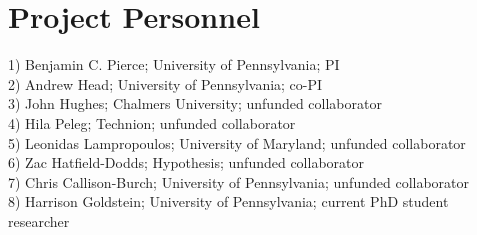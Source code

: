 \section*{Project Personnel}

1) Benjamin C. Pierce; University of Pennsylvania; PI \\
2) Andrew Head; University of Pennsylvania; co-PI \\
3) John Hughes; Chalmers University; unfunded collaborator \\
4) Hila Peleg; Technion; unfunded collaborator \\
5) Leonidas Lampropoulos; University of Maryland; unfunded collaborator \\
6) Zac Hatfield-Dodds; Hypothesis; unfunded collaborator \\
7) Chris Callison-Burch; University of Pennsylvania; unfunded collaborator \\
8) Harrison Goldstein; University of Pennsylvania; current PhD student researcher
